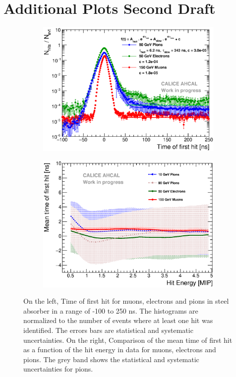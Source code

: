 \documentclass[12pt]{article}
\begin{document}
\newpage
\section{Additional Plots Second Draft}

\begin{figure}[htbp!]
  \begin{subfigure}[t]{0.49\textwidth}
    \centering
    \includegraphics[width=1\textwidth]{../../Draft/fig/Timing_dNdt_Comparison_50GeVe.eps}
    \caption{} \label{fig:dNdt_Data_50GeVe}
  \end{subfigure}
  \hfill
  \begin{subfigure}[t]{0.49\textwidth}
    \centering
    \includegraphics[width=1\textwidth]{../../Draft/fig/Timing_Energy_Comparison_ShortAsymRange.eps}
    \caption{} \label{fig:Energy_Data_all}
  \end{subfigure}
  \caption{On the left, Time of first hit for muons, electrons and pions in steel absorber in a range of -100 to 250 ns. The histograms are normalized to the number of events where at least one hit was identified. The errors bars are statistical and systematic uncertainties. On the right, Comparison of the mean time of first hit as a function of the hit energy in data for muons, electrons and pions. The grey band shows the statistical and systematic uncertainties for pions.}
\end{figure}
\end{document}
